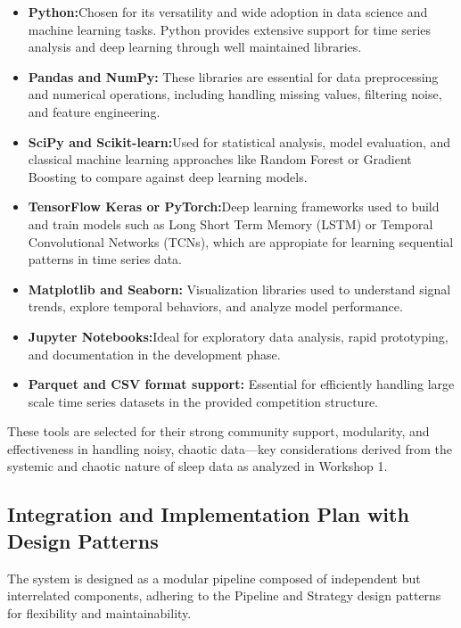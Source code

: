 \documentclass[conference]{IEEEtran}
\begin{document}
\begin{itemize}
\item \textbf{Python:}Chosen for its versatility and wide adoption in data science and machine learning tasks. Python provides extensive support for time series analysis and deep learning through well maintained libraries.
\item \textbf{Pandas and NumPy:} These libraries are essential for data preprocessing and numerical operations, including handling missing values, filtering noise, and feature engineering.

\item \textbf{SciPy and Scikit-learn:}Used for statistical analysis, model evaluation, and classical machine learning approaches like Random Forest or Gradient Boosting to compare against deep learning models.

\item \textbf{TensorFlow Keras or PyTorch:}Deep learning frameworks used to build and train models such as Long Short Term Memory (LSTM) or Temporal Convolutional Networks (TCNs), which are appropiate for learning sequential patterns in time series data.

\item \textbf{Matplotlib and Seaborn:} Visualization libraries used to understand signal trends, explore temporal behaviors, and analyze model performance.

\item \textbf{Jupyter Notebooks:}Ideal for exploratory data analysis, rapid prototyping, and documentation in the development phase.

\item \textbf{Parquet and CSV format support:} Essential for efficiently handling large scale time series datasets in the provided competition structure.
\end{itemize}

These tools are selected for their strong community support, modularity, and effectiveness in handling noisy, chaotic data—key considerations derived from the systemic and chaotic nature of sleep data as analyzed in Workshop 1.

\subsection{Integration and Implementation Plan with Design Patterns}

The system is designed as a modular pipeline composed of independent but interrelated components, adhering to the Pipeline and Strategy design patterns for flexibility and maintainability.
\end{document}
